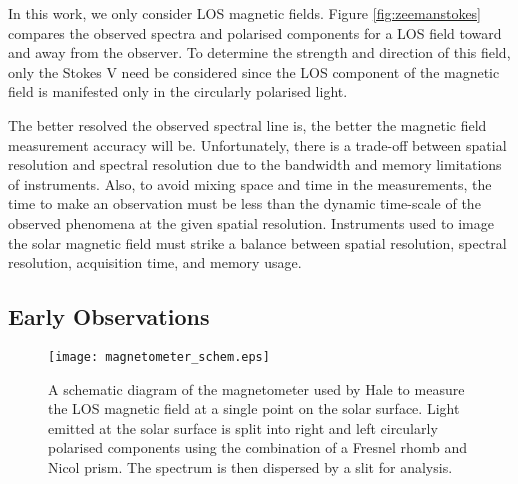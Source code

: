 In this work, we only consider \gls{LOS} magnetic fields. Figure \ref{fig:zeemanstokes} compares the observed spectra and polarised components for a \gls{LOS} field toward and away from the observer. To determine the strength and direction of this field, only the Stokes V need be considered since the \gls{LOS} component of the magnetic field is manifested only in the circularly polarised light.

The better resolved the observed spectral line is, the better the magnetic field measurement accuracy will be. Unfortunately, there is a trade-off between spatial resolution and spectral resolution due to the bandwidth and memory limitations of instruments. Also, to avoid mixing space and time in the  measurements, the time to make an observation must be less than the dynamic time-scale of the observed phenomena at the given spatial resolution. Instruments used to image the solar magnetic field must strike a balance between spatial resolution, spectral resolution, acquisition time, and memory usage.


\subsection{Early Observations} \label{subsect:magearly}


\begin{figure}[t]
\centerline{\texttt{[image: magnetometer\_schem.eps]}}
\caption[A schematic of Hale's magnetometer.]{A schematic diagram of the magnetometer used by Hale to measure the LOS magnetic field at a single point on the solar surface. Light emitted at the solar surface is split into right and left circularly polarised components using the combination of a Fresnel rhomb and Nicol prism. The spectrum is then dispersed by a slit for analysis.}\label{fig:magnetometer_schem}
\end{figure}

